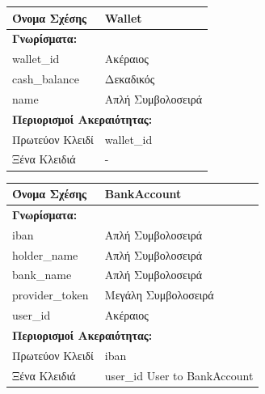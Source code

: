 \vspace{1cm}

\noindent
\begin{tabular}{|p{6cm}|p{6cm}|}
\hline
\textbf{Όνομα Σχέσης} & Wallet \\ \hline

\multicolumn{2}{|l|}{\textbf{Γνωρίσματα:}} \\ \hline
wallet\_id & Ακέραιος \\ \hline
cash\_balance & Δεκαδικός \\ \hline
name & Απλή Συμβολοσειρά \\ \hline
    
\multicolumn{2}{|l|}{\textbf{Περιορισμοί Ακεραιότητας:}} \\ \hline
Πρωτεύον Κλειδί & wallet\_id \\ \hline
Ξένα Κλειδιά & - \\ \hline
\end{tabular}

\vspace{1cm}

\noindent
\begin{tabular}{|p{6cm}|p{6cm}|}
\hline
\textbf{Όνομα Σχέσης} & BankAccount \\ \hline

\multicolumn{2}{|l|}{\textbf{Γνωρίσματα:}} \\ \hline
iban & Απλή Συμβολοσειρά \\ \hline
holder\_name & Απλή Συμβολοσειρά \\ \hline
bank\_name & Απλή Συμβολοσειρά \\ \hline
provider\_token & Μεγάλη Συμβολοσειρά \\ \hline
user\_id & Ακέραιος \\ \hline

\multicolumn{2}{|l|}{\textbf{Περιορισμοί Ακεραιότητας:}} \\ \hline
Πρωτεύον Κλειδί & iban \\ \hline
Ξένα Κλειδιά & user\_id User to BankAccount \\ \hline
\end{tabular}

\vspace{1cm}

